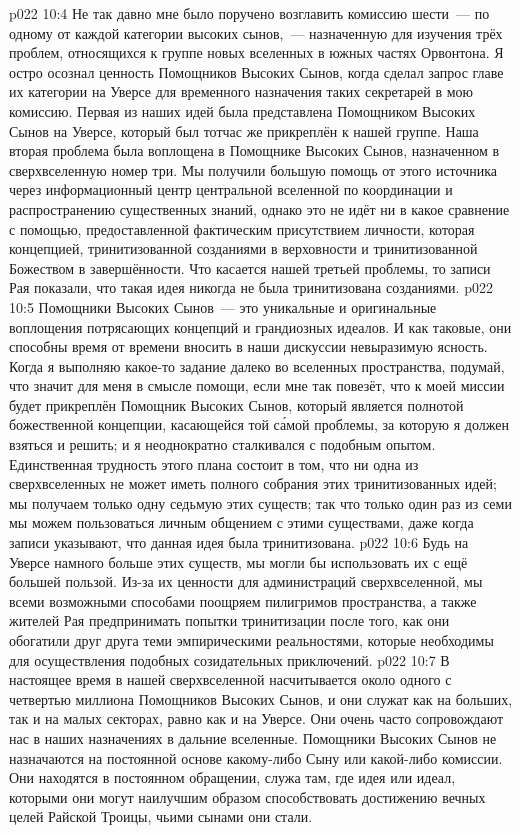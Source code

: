 \vs p022 10:4 \pc Не так давно мне было поручено возглавить комиссию шести~--- по одному от каждой категории высоких сынов,~--- назначенную для изучения трёх проблем, относящихся к группе новых вселенных в южных частях Орвонтона. Я остро осознал ценность Помощников Высоких Сынов, когда сделал запрос главе их категории на Уверсе для временного назначения таких секретарей в мою комиссию. Первая из наших идей была представлена Помощником Высоких Сынов на Уверсе, который был тотчас же прикреплён к нашей группе. Наша вторая проблема была воплощена в Помощнике Высоких Сынов, назначенном в сверхвселенную номер три. Мы получили большую помощь от этого источника через информационный центр центральной вселенной по координации и распространению существенных знаний, однако это не идёт ни в какое сравнение с помощью, предоставленной фактическим присутствием личности, которая  концепцией, тринитизованной созданиями в верховности и тринитизованной Божеством в завершённости. Что касается нашей третьей проблемы, то записи Рая показали, что такая идея никогда не была тринитизована созданиями.
\vs p022 10:5 \pc Помощники Высоких Сынов~--- это уникальные и оригинальные воплощения потрясающих концепций и грандиозных идеалов. И как таковые, они способны время от времени вносить в наши дискуссии невыразимую ясность. Когда я выполняю какое\hyp{}то задание далеко во вселенных пространства, подумай, что значит для меня в смысле помощи, если мне так повезёт, что к моей миссии будет прикреплён Помощник Высоких Сынов, который является полнотой божественной концепции, касающейся той с\'амой проблемы, за которую я должен взяться и решить; и я неоднократно сталкивался с подобным опытом. Единственная трудность этого плана состоит в том, что ни одна из сверхвселенных не может иметь полного собрания этих тринитизованных идей; мы получаем только одну седьмую этих существ; так что только один раз из семи мы можем пользоваться личным общением с этими существами, даже когда записи указывают, что данная идея была тринитизована.
\vs p022 10:6 Будь на Уверсе намного больше этих существ, мы могли бы использовать их с ещё большей пользой. Из\hyp{}за их ценности для администраций сверхвселенной, мы всеми возможными способами поощряем пилигримов пространства, а также жителей Рая предпринимать попытки тринитизации после того, как они обогатили друг друга теми эмпирическими реальностями, которые необходимы для осуществления подобных созидательных приключений.
\vs p022 10:7 \pc В настоящее время в нашей сверхвселенной насчитывается около одного с четвертью миллиона Помощников Высоких Сынов, и они служат как на больших, так и на малых секторах, равно как и на Уверсе. Они очень часто сопровождают нас в наших назначениях в дальние вселенные. Помощники Высоких Сынов не назначаются на постоянной основе какому\hyp{}либо Сыну или какой\hyp{}либо комиссии. Они находятся в постоянном обращении, служа там, где идея или идеал, которыми они  могут наилучшим образом способствовать достижению вечных целей Райской Троицы, чьими сынами они стали.
